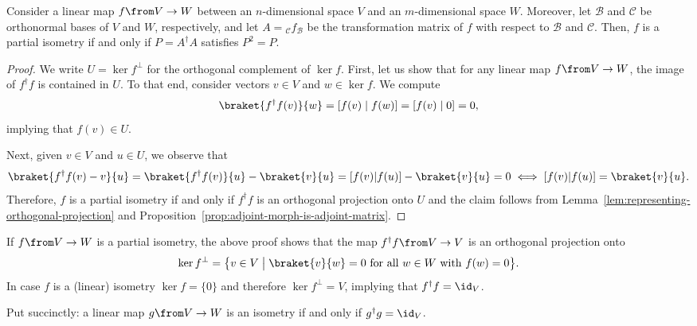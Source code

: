 \documentclass[a4paper,oneside, 12pt]{amsart}
\begin{document}
\begin{lemma}\label{lem:transformation-matrix-of-isometry}
  Consider a linear map \(f \from V\to W\) between an \(n\)-dimensional space \(V\) and an \(m\)-dimensional space \(W\).
  Moreover, let \(\mathcal{B}\) and \(\mathcal{C}\) be orthonormal bases of \(V\) and \(W\), respectively, and let \(A={}_{\mathcal{C}}f_{\mathcal{B}}\) be the transformation matrix of \(f\) with respect to \(\mathcal{B}\) and \(\mathcal{C}\).
  Then, \(f\) is a partial isometry if and only if \(P= A^{\dagger} A\) satisfies \(P^{2}= P\).
\end{lemma}
\begin{proof}
  We write \(U = \ker f^{\perp}\) for the orthogonal complement of \(\ker f\).
  First, let us show that for any linear map \(f\from V \to W\), the image of \(f^{\dagger}f\) is contained in \(U\).
  To that end, consider  vectors \(v\in V\) and \(w \in \ker f\).
  We compute
  \begin{equation*}
    \braket{f^{\dagger}f(v)}{w}
    = [f(v) \mid f(w)]
    = [f(v) \mid 0 ]
    = 0,
  \end{equation*}
  implying that \(f(v) \in U\).

  Next, given \(v \in V\) and \(u\in U\), we observe that
  \begin{equation*}
    \braket{f^{\dagger}f(v) - v}{u}
    = \braket{f^{\dagger}f(v)}{u} - \braket{v}{u}
    = [f(v) | f(u)] - \braket{v}{u} = 0 \iff [f(v) | f(u)] = \braket{v}{u}.
  \end{equation*}
  Therefore, \(f\) is a partial isometry if and only if \(f^{\dagger}f\) is an orthogonal projection onto \(U\) and the claim follows from Lemma~\ref{lem:representing-orthogonal-projection} and Proposition~\ref{prop:adjoint-morph-is-adjoint-matrix}.
\end{proof}

\begin{remark}\label{rmk:isometries-vs-partial-isometries}
  If  \(f \from V\to W\) is a partial isometry, the above proof shows that the map \(f^{\dagger} f \from V\to V\) is an orthogonal projection onto
  \begin{equation*}
    \ker f^{\perp} = \big\{v\in V \;\big\vert\; \braket{v}{w} = 0 \text{ for all } w\in W \text{ with } f(w) = 0 \big\}.
  \end{equation*}
  In case \(f\) is a (linear) isometry \(\ker f =\{0\}\) and therefore \(\ker f^{\perp} = V\), implying that \(f^{\dagger} f = \id_{V}\).

  Put succinctly: a linear map \(g \from V \to W\) is an isometry if and only if \(g^{\dagger} g =\id_{V}\).
\end{remark}
\end{document}
